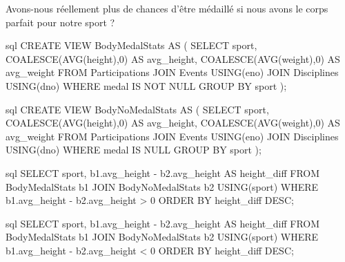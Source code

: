 \documentclass{mytex}
\begin{document}



Avons-nous réellement plus de chances d'être médaillé si nous avons le corps parfait pour notre sport ?


\begin{codeboxlang}[title=Physique des médaillés par sport]{sql}
	CREATE VIEW BodyMedalStats AS (
	SELECT sport, COALESCE(AVG(height),0) AS avg_height, COALESCE(AVG(weight),0) AS avg_weight
	FROM Participations
	JOIN Events USING(eno)
	JOIN Disciplines USING(dno)
	WHERE medal IS NOT NULL
	GROUP BY sport
	);
\end{codeboxlang}



\begin{codeboxlang}[title=Physique des non-médaillés par sport]{sql}
	CREATE VIEW BodyNoMedalStats AS (
	SELECT sport, COALESCE(AVG(height),0) AS avg_height, COALESCE(AVG(weight),0) AS avg_weight
	FROM Participations
	JOIN Events USING(eno)
	JOIN Disciplines USING(dno)
	WHERE medal IS NULL
	GROUP BY sport
	);
\end{codeboxlang}



\begin{codeboxlang}[title=]{sql}
	SELECT sport, b1.avg_height - b2.avg_height AS height_diff
	FROM BodyMedalStats b1
	JOIN BodyNoMedalStats b2 USING(sport) 
	WHERE b1.avg_height - b2.avg_height > 0
	ORDER BY height_diff DESC;
\end{codeboxlang}



\begin{codeboxlang}[title=]{sql}
	SELECT sport, b1.avg_height - b2.avg_height AS height_diff
	FROM BodyMedalStats b1
	JOIN BodyNoMedalStats b2 USING(sport) 
	WHERE b1.avg_height - b2.avg_height < 0
	ORDER BY height_diff DESC;
\end{codeboxlang}
\end{document}
